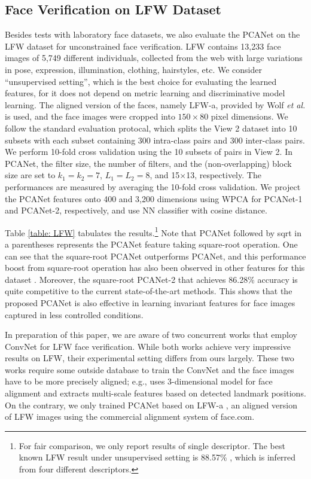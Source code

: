 \documentclass[10pt,journal,compsoc]{IEEEtran}
\begin{document}
\subsection{Face Verification on LFW Dataset}
Besides tests with laboratory face datasets, we also evaluate the PCANet on the LFW dataset \cite{Huang2007} for unconstrained face verification. LFW contains 13,233 face images of 5,749 different individuals, collected from the web with large variations in pose, expression, illumination, clothing, hairstyles, etc. We consider ``unsupervised setting'', which is the best choice for evaluating the learned features, for it does not depend on metric learning and discriminative model learning. The aligned version of the faces, namely LFW-a, provided by Wolf {\it et al.} \cite{Wolf2011} is used, and the face images were cropped into $150 \times 80$ pixel dimensions. We follow the standard evaluation protocal, which splits the View 2 dataset into 10 subsets with each subset containing 300 intra-class pairs and 300 inter-class pairs. We perform 10-fold cross validation using the 10 subsets of pairs in View 2. In PCANet, the filter size, the number of filters, and the (non-overlapping) block size are set to $k_1 = k_2 = 7$, $L_1 = L_2 = 8$, and 15$\times$13, respectively. The performances are measured by averaging the 10-fold cross validation. We project the PCANet features onto 400 and 3,200 dimensions using WPCA for PCANet-1 and PCANet-2, respectively, and use NN classifier with cosine distance.


{
Table \ref{table: LFW} tabulates the results.\footnote{For fair comparison, we only report results of single descriptor. The best known LFW result under unsupervised setting is 88.57\% \cite{Barkan2013}, which is inferred from four different descriptors. } Note that PCANet followed by sqrt in a parentheses represents the PCANet feature taking square-root operation. One can see that the square-root PCANet outperforms PCANet, and this performance boost from square-root operation has also been observed in other features for this dataset \cite{Barkan2013}. Moreover, the square-root PCANet-2 that achieves 86.28$\%$ accuracy is quite competitive to the current state-of-the-art methods.
This shows that the proposed PCANet is also effective in learning invariant features for face images captured in less controlled conditions.

In preparation of this paper, we are aware of two concurrent works \cite{Taigman2014, Fan2014} that employ ConvNet for LFW face verification. While both works achieve very impressive results on LFW, their experimental setting differs from ours largely. These two works require some outside database to train the ConvNet and the face images have to be more precisely aligned; e.g., \cite{Taigman2014} uses 3-dimensional model for face alignment and \cite{Fan2014} extracts multi-scale features based on detected landmark positions. On the contrary, we only trained PCANet based on LFW-a  \cite{Wolf2011}, an aligned version of LFW images using the commercial alignment system of face.com. }
\end{document}

